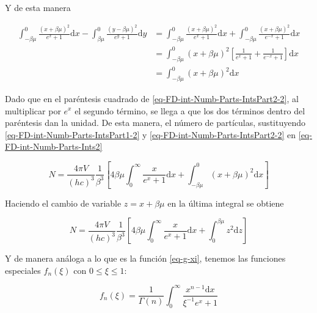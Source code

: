 Y de esta manera

\begin{equation}\label{eq-FD-int-Numb-Parts-IntsPart2-2}
\begin{split}
\int_{-\beta \mu}^{0} \frac{(x + \beta \mu)^{2}}{{e}^{x}+1}  \mathrm{d}x - \int_{\beta \mu}^{0} \frac{(y -\beta \mu)^{2}}{{e}^{y}+1}  \mathrm{d}y & = \int_{-\beta \mu}^{0} \frac{(x + \beta \mu)^{2}}{{e}^{x}+1}  \mathrm{d}x  +  \int_{-\beta \mu}^{0} \frac{(x + \beta \mu)^{2}}{{e}^{-x}+1}  \mathrm{d}x \\ 
& =  \int_{-\beta \mu}^{0} (x + \beta \mu)^{2} \left[\frac{1}{{e}^{x} + 1} + \frac{1}{{e}^{-x} + 1} \right] \mathrm{d}x \\
& = \int_{-\beta \mu}^{0} (x + \beta \mu)^{2} \mathrm{d}x
\end{split}
\end{equation}

Dado que en el paréntesis cuadrado de \eqref{eq-FD-int-Numb-Parts-IntsPart2-2}, al multiplicar por ${e}^{x}$ el segundo término, se llega a que los dos términos dentro del paréntesis dan la unidad. De esta manera, el número de partículas, sustituyendo \eqref{eq-FD-int-Numb-Parts-IntsPart1-2} y \eqref{eq-FD-int-Numb-Parts-IntsPart2-2} en \eqref{eq-FD-int-Numb-Parts-Ints2}

\begin{equation}
N = \frac{4 \pi V}{(hc)^{3}} \frac{1}{{\beta}^{3}} \left[4\beta \mu \int_{0}^{\infty} \frac{x}{{e}^{x} + 1} \mathrm{d} x + \int_{-\beta \mu}^{0} (x + \beta \mu)^{2} \mathrm{d}x \right]
\end{equation}

Haciendo el cambio de variable ${z} = x + \beta \mu$ en la última integral se obtiene

\begin{equation}\label{eq-FD-int-Numb-Parts-Ints3}
N = \frac{4 \pi V}{(hc)^{3}} \frac{1}{{\beta}^{3}} \left[4\beta \mu \int_{0}^{\infty} \frac{x}{{e}^{x} + 1} \mathrm{d} x + \int_{0}^{\beta \mu} {z}^{2} \mathrm{d}z \right]
\end{equation}

Y de manera análoga a lo que es la función \eqref{eq-g-xi}, tenemos las funciones especiales ${f}_{n}(\xi)$ con $0 \leq \xi \leq 1$:

\begin{equation}\label{eq-f-xi}
{f}_{n}(\xi) = \frac{1}{\Gamma(n)} \int_{0}^{\infty} \frac{{x}^{n-1} \mathrm{d}x}{{\xi}^{-1}{e}^{x} + 1}
\end{equation}

